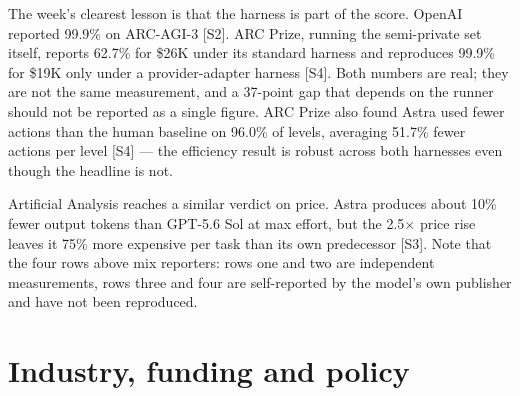 \documentclass[11pt,a4paper]{article}
\newcommand{\srcref}[1]{\textcolor{brandaccent}{[S#1]}}
\begin{document}
The week's clearest lesson is that the harness is part of the score. OpenAI reported 99.9\%
on ARC-AGI-3 \srcref{2}. ARC Prize, running the semi-private set itself, reports 62.7\% for
\$26K under its standard harness and reproduces 99.9\% for \$19K only under a
provider-adapter harness \srcref{4}. Both numbers are real; they are not the same
measurement, and a 37-point gap that depends on the runner should not be reported as a
single figure. ARC Prize also found Astra used fewer actions than the human baseline on
96.0\% of levels, averaging 51.7\% fewer actions per level \srcref{4} --- the efficiency
result is robust across both harnesses even though the headline is not.

Artificial Analysis reaches a similar verdict on price. Astra produces about 10\% fewer
output tokens than GPT-5.6 Sol at max effort, but the 2.5$\times$ price rise leaves it 75\%
more expensive per task than its own predecessor \srcref{3}. Note that the four rows above
mix reporters: rows one and two are independent measurements, rows three and four are
self-reported by the model's own publisher and have not been reproduced.

\section{Industry, funding and policy}
\end{document}

